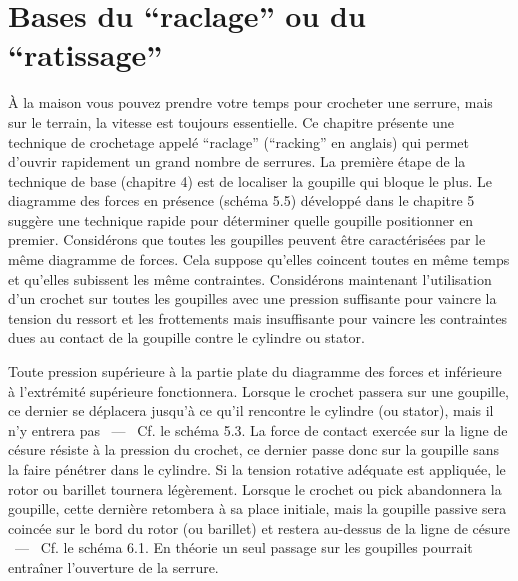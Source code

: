 \documentclass[a4paper,french,11pt,twoside]{report}
\begin{document}
\chapter{Bases du \enquote{raclage} ou du \enquote{ratissage}}

À la maison vous pouvez prendre votre temps pour crocheter une serrure, mais sur le terrain, la vitesse est toujours essentielle. Ce chapitre présente une technique de crochetage appelé \enquote{raclage} (\enquote{racking} en anglais) qui permet d'ouvrir rapidement un grand nombre de serrures. La première étape de la technique de base (chapitre 4) est de localiser la goupille qui bloque le plus. Le diagramme des forces en présence (schéma 5.5) développé dans le chapitre 5 suggère une technique rapide pour déterminer quelle goupille positionner en premier. Considérons que toutes les goupilles peuvent être caractérisées par le même diagramme de forces. Cela suppose qu'elles coincent toutes en même temps et qu'elles subissent les même contraintes. Considérons maintenant l'utilisation d'un crochet sur toutes les goupilles avec une pression suffisante pour vaincre la tension du ressort et les frottements mais insuffisante pour vaincre les contraintes dues au contact de la goupille contre le cylindre ou stator.

Toute pression supérieure à la partie plate du diagramme des forces et inférieure à l'extrémité supérieure fonctionnera. Lorsque le crochet passera sur une goupille, ce dernier se déplacera jusqu'à ce qu'il rencontre le cylindre (ou stator), mais il n'y entrera pas ~---~ Cf. le schéma 5.3. La force de contact exercée sur la ligne de césure résiste à la pression du crochet, ce dernier passe donc sur la goupille sans la faire pénétrer dans le cylindre. Si la tension rotative adéquate est appliquée, le rotor ou barillet tournera légèrement. Lorsque le crochet ou pick abandonnera la goupille, cette dernière retombera à sa place initiale, mais la goupille passive sera coincée sur le bord du rotor (ou barillet) et restera au-dessus de la ligne de césure ~---~ Cf. le schéma 6.1.
En théorie un seul passage sur les goupilles pourrait entraîner l'ouverture de la serrure.
\end{document}
